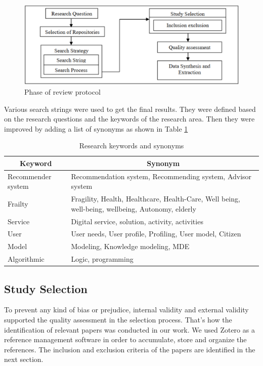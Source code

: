 \documentclass[preprint,3p,times,number]{elsarticle}
\begin{document}
\begin{figure}
 \begin{center}
    \includegraphics[width=0.5\linewidth]{figures/Review Protocol.png}
    \caption{Phase of review protocol}
    \label{fig:Review Protocol}
 \end{center}
\end{figure}



Various search strings were used to get the final results. They were defined based on the research questions and the keywords of the research area.
Then they were improved by adding a list of synonyms as shown in Table \ref{tab:Keywords}

\begin{table}
\centering
\footnotesize
\begin{tabularx}{\linewidth}{p{3cm}|X}
\toprule
\multicolumn{1}{c|}{\normalsize\textbf{Keyword}} & \multicolumn{1}{c}{\normalsize\textbf{Synonym}} \\
\midrule
Recommender system &  Recommendation system, Recommending system, Advisor system
             \\
Frailty  & Fragility, Health, Healthcare, Health-Care, Well being, well-being, wellbeing, Autonomy, elderly
              \\
Service & Digital service, solution, activity, activities
             \\
User & User needs, User profile, Profiling, User model, Citizen
             \\
Model & Modeling, Knowledge modeling, MDE
            \\
Algorithmic &  Logic, programming
            \\
\bottomrule
\end{tabularx}
\caption{Research keywords and synonyms}
\label{tab:Keywords}
\end{table} 

\subsection{Study Selection}

To prevent any kind of bias or prejudice, internal validity and external validity supported the quality assessment in the selection process. That's how  
the identification of relevant papers was conducted in our work. 
We used Zotero as a reference management software in order to accumulate, store and organize the references. The inclusion and exclusion criteria of the papers are identified in the next section.
\end{document}
